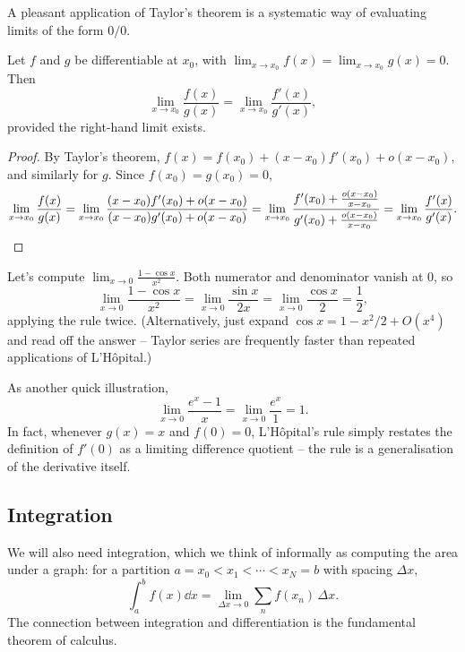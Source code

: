 \documentclass[a4paper]{scrartcl}
\begin{document}
A pleasant application of Taylor's theorem is a systematic way of evaluating limits of the form $0/0$.

\begin{theorem}
	Let $f$ and $g$ be differentiable at $x_0$, with
	$\lim_{x \to x_0} f(x) = \lim_{x \to x_0} g(x) = 0$. Then
	$$
	\lim_{x \to x_0} \frac{f(x)}{g(x)} = \lim_{x \to x_0} \frac{f'(x)}{g'(x)},
	$$
	provided the right-hand limit exists.
\end{theorem}
\begin{proof}
	By Taylor's theorem, $f(x) = f(x_0) + (x - x_0) f'(x_0) + o(x - x_0)$, and similarly for $g$. Since $f(x_0) = g(x_0) = 0$,
	$$
	\lim_{x \to x_0} \frac{f(x)}{g(x)}
	= \lim_{x \to x_0} \frac{(x - x_0)f'(x_0) + o(x - x_0)}{(x - x_0)g'(x_0) + o(x - x_0)}
	= \lim_{x \to x_0} \frac{f'(x_0) + \frac{o(x - x_0)}{x - x_0}}{g'(x_0) + \frac{o(x - x_0)}{x - x_0}}
	= \lim_{x \to x_0} \frac{f'(x)}{g'(x)}. \qedhere
	$$
\end{proof}

\begin{example}
	Let's compute $\lim_{x \to 0} \frac{1 - \cos x}{x^2}$. Both numerator and denominator vanish at $0$, so
	$$
	\lim_{x \to 0} \frac{1 - \cos x}{x^2} = \lim_{x \to 0} \frac{\sin x}{2x} = \lim_{x \to 0} \frac{\cos x}{2} = \frac{1}{2},
	$$
	applying the rule twice. (Alternatively, just expand $\cos x = 1 - x^2/2 + O(x^4)$ and read off the answer -- Taylor series are frequently faster than repeated applications of L'H\^opital.)
\end{example}

\begin{example}
	As another quick illustration,
	$$
	\lim_{x \to 0} \frac{e^x - 1}{x} = \lim_{x \to 0}\frac{e^x}{1} = 1.
	$$
	In fact, whenever $g(x) = x$ and $f(0) = 0$, L'H\^opital's rule simply restates the definition of $f'(0)$ as a limiting difference quotient -- the rule is a generalisation of the derivative itself.
\end{example}

\subsection{Integration}

We will also need integration, which we think of informally as computing the area under a graph: for a partition $a = x_0 < x_1 < \cdots < x_N = b$ with spacing $\Delta x$,
$$
\int_a^b f(x) \dd x = \lim_{\Delta x \to 0} \sum_{n} f(x_n) \, \Delta x.
$$
The connection between integration and differentiation is the fundamental theorem of calculus.
\end{document}
